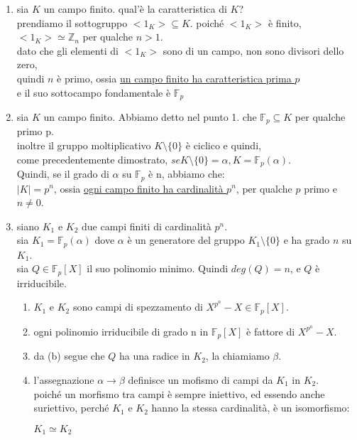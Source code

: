 \documentclass[a4paper,12pt]{article}
\theoremstyle{def}
\theoremstyle{prop}
\theoremstyle{esempio}
\theoremstyle{dimostrazione}
\theoremstyle{teo}
\theoremstyle{osservazione}
\begin{document}
\begin{enumerate}
	\item sia \(K\) un campo finito. qual'è la caratteristica di \(K\)?\\
	      prendiamo il sottogruppo \(<1_K> \subseteq K\). poiché \(<1_K>\) è finito,\\
	      \(<1_K> \simeq \mathbb{Z}_n\) per qualche \(n > 1\).\\
	      dato che gli elementi di \(<1_K>\) sono di un campo, non sono divisori dello zero,\\
	      quindi \(n\) è primo, ossia \underline{un campo finito ha caratteristica prima \(p\)}\\
	      e il suo sottocampo fondamentale è \(\mathbb{F}_p\)\\
	\item sia \(K\) un campo finito. Abbiamo detto nel punto 1. che \(\mathbb{F}_p \subseteq K\) per qualche primo p.\\
	      inoltre il gruppo moltiplicativo \(K \setminus \{0\}\) è ciclico e quindi,\\
	      come precedentemente dimostrato, \(se K \setminus \{0\} = \alpha, K = \mathbb{F}_p(\alpha)\).\\
	      Quindi, se il grado di \(\alpha\) su \(\mathbb{F}_p\) è n, abbiamo che:\\
	      \(|K| = p^n\), ossia \underline{ogni campo finito ha cardinalità \(p^n\)}, per qualche \(p\) primo e \(n \neq 0\).\\
	\item siano \(K_1\) e \(K_2\) due campi finiti di cardinalità \(p^n\).\\
	      sia \(K_1 = \mathbb{F}_p(\alpha)\) dove \(\alpha\) è un generatore del gruppo \(K_1 \setminus \{0\}\) e ha grado \(n\) su \(K_1\).\\
	      sia \(Q \in \mathbb{F}_p[X]\) il suo polinomio minimo. Quindi \(deg(Q) = n\), e \(Q\) è irriducibile.\\
	      \begin{enumerate}
		      \item \(K_1\) e \(K_2\) sono campi di spezzamento di \(X^{p^n} - X \in \mathbb{F}_p[X]\).
		      \item ogni polinomio irriducibile di grado n in \(\mathbb{F}_p[X]\) è fattore di \(X^{p^n} - X\).
		      \item da (b) segue che \(Q\) ha una radice in \(K_2\), la chiamiamo \(\beta\).
		      \item l'assegnazione \(\alpha \rightarrow \beta\) definisce un mofismo di campi da \(K_1\) in \(K_2\).\\
		            poiché un morfismo tra campi è sempre iniettivo, ed essendo anche suriettivo,
		            perché \(K_1\) e \(K_2\) hanno la stessa cardinalità, è un isomorfismo:
		            \begin{center}
			            \(K_1 \simeq K_2\)
		            \end{center}
	      \end{enumerate}
\end{enumerate}
\end{document}

